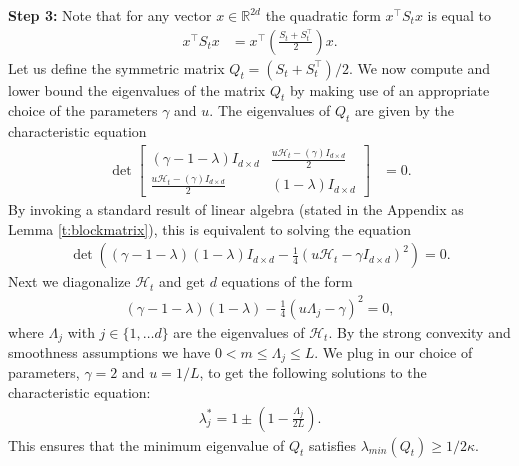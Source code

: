 \begin{Proof}
\textbf{Step 3:} Note that for any vector $x\in \mathbb{R}^{2d}$ the quadratic form $x^{\top}S_t x$ is equal to 
\begin{align*}
x^{\top}S_t x & = x^{\top}\left( \frac{S_t + S_t^{\top}}{2}\right)x.
\end{align*}
Let us define the symmetric matrix $Q_t = (S_t + S_t^{\top})/2$. We now compute and lower bound the eigenvalues of the matrix $Q_t$ by making use of an appropriate choice of the parameters $\gamma$ and $u$. The eigenvalues of $Q_t$ are given by the characteristic equation
\begin{align*}
\det\begin{bmatrix}
  (\gamma - 1- \lambda) I_{d\times d} & \frac{u \mathcal{H}_t - (\gamma)I_{d\times d}}{2} \\
  \frac{u \mathcal{H}_t - (\gamma)I_{d\times d}}{2} & (1-\lambda) I_{d\times d}
 \end{bmatrix}  & = 0.
\end{align*}
By invoking a standard result of linear algebra (stated in the Appendix as  Lemma \ref{t:blockmatrix}), this is equivalent to solving the equation
\begin{align*}
\det\left((\gamma - 1-\lambda)(1-\lambda)I_{d\times d}- \frac{1}{4}\left( u \mathcal{H}_t - \gamma I_{d\times d}\right)^2\right) = 0.
\end{align*}
Next we diagonalize $\mathcal{H}_t$ and get $d$ equations of the form
\begin{align*}
(\gamma - 1  -\lambda )(1-\lambda )- \frac{1}{4}\left( u \Lambda_j - \gamma\right)^2 = 0,
\end{align*}
where $\Lambda_j$ with $j\in \{1,\ldots d\}$ are the eigenvalues of $\mathcal{H}_t$. By the strong convexity and smoothness assumptions we have $0<m\le\Lambda_j \le L$. We plug in our choice of parameters, $\gamma = 2$ and $u= 1/L$, to get the following solutions to the characteristic equation:
\begin{align*}
\lambda^*_j = 1 \pm \left(1 - \frac{\Lambda_j}{2L}\right).
\end{align*}
This ensures that the minimum eigenvalue of $Q_t$ satisfies $\lambda_{min}(Q_t) \ge 1/2\kappa$. 


\end{Proof}
